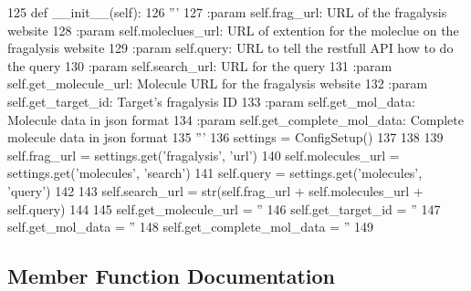 \begin{DoxyCode}
125     \textcolor{keyword}{def }\_\_init\_\_(self):
126         \textcolor{stringliteral}{'''}
127 \textcolor{stringliteral}{        :param self.frag\_url: URL of the fragalysis website}
128 \textcolor{stringliteral}{        :param self.moleclues\_url: URL of extention for the moleclue on the fragalysis website}
129 \textcolor{stringliteral}{        :param self.query: URL to tell the restfull API how to do the query}
130 \textcolor{stringliteral}{        :param self.search\_url: URL for the query }
131 \textcolor{stringliteral}{        :param self.get\_molecule\_url: Molecule URL for the fragalysis website}
132 \textcolor{stringliteral}{        :param self.get\_target\_id: Target's fragalysis ID }
133 \textcolor{stringliteral}{        :param self.get\_mol\_data: Molecule data in json format}
134 \textcolor{stringliteral}{        :param self.get\_complete\_mol\_data: Complete molecule data in json format}
135 \textcolor{stringliteral}{        '''}
136         settings = ConfigSetup()
137 
138 
139         self.frag\_url = settings.get(\textcolor{stringliteral}{'fragalysis'}, \textcolor{stringliteral}{'url'})
140         self.molecules\_url = settings.get(\textcolor{stringliteral}{'molecules'}, \textcolor{stringliteral}{'search'})
141         self.query = settings.get(\textcolor{stringliteral}{'molecules'}, \textcolor{stringliteral}{'query'})
142 
143         self.search\_url = str(self.frag\_url + self.molecules\_url + self.query)
144 
145         self.get\_molecule\_url = \textcolor{stringliteral}{''}
146         self.get\_target\_id = \textcolor{stringliteral}{''}
147         self.get\_mol\_data = \textcolor{stringliteral}{''}
148         self.get\_complete\_mol\_data = \textcolor{stringliteral}{''}
149 
\end{DoxyCode}


\subsection{Member Function Documentation}
\mbox{\label{classfragalysis__api_1_1xcextracter_1_1getdata_1_1_get_molecules_data_a5bf2f4562196e169f76aa30cdcd9029d}} 
